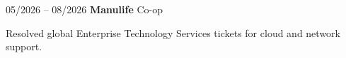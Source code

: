\begin{twocolentry}{05/2026 – 08/2026} \textbf{Manulife}
\newline Co-op \end{twocolentry}
\begin{onecolentry}
\begin{highlights}
\item Resolved global Enterprise Technology Services tickets for cloud and network support.
\end{highlights}
\end{onecolentry}
